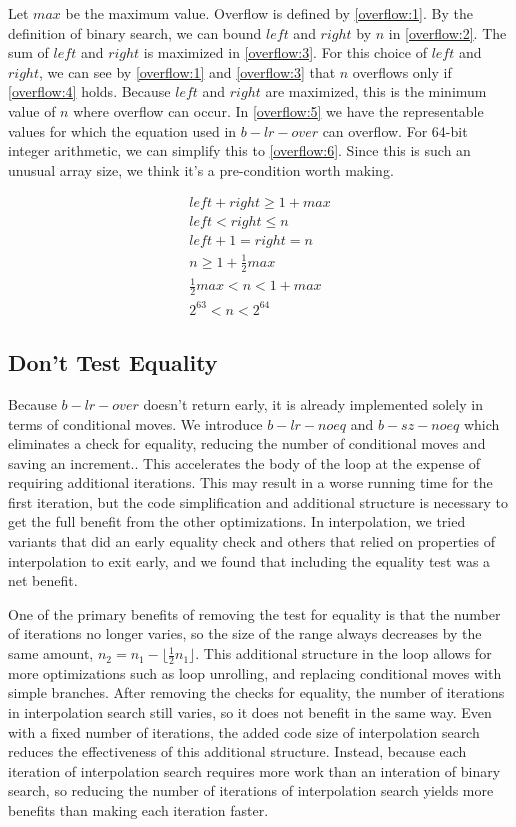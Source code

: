 \documentclass[twocolumn]{article}
\begin{document}
Let $max$ be the maximum value. Overflow is defined by \eqref{overflow:1}. By the definition of binary search, we can bound $left$ and $right$ by $n$ in \eqref{overflow:2}. The sum of $left$ and $right$ is maximized in \eqref{overflow:3}. For this choice of $left$ and $right$, we can see by \eqref{overflow:1} and \eqref{overflow:3} that $n$ overflows only if \eqref{overflow:4} holds. Because $left$ and $right$ are maximized, this is the minimum value of $n$ where overflow can occur. In \eqref{overflow:5} we have the representable values for which the equation used in $b-lr-over$ can overflow. For 64-bit integer arithmetic, we can simplify this to \eqref{overflow:6}. Since this is such an unusual array size, we think it's a pre-condition worth making.

\begin{align}
left + right \geq 1 + max \label{overflow:1}
\\ left < right \leq n \label{overflow:2}
\\ left + 1 = right = n \label{overflow:3}
\\ n \geq 1 + \frac{1}{2}max \label{overflow:4}
\\ \frac{1}{2}max < n < 1 + max \label{overflow:5}
\\ 2^{63} < n < 2^{64} \label{overflow:6}
\end{align}

\subsection{Don't Test Equality}
Because $b-lr-over$ doesn't return early, it is already implemented solely in terms of conditional moves. We introduce $b-lr-noeq$ and $b-sz-noeq$ which eliminates a check for equality, reducing the number of conditional moves and saving an increment.. This accelerates the body of the loop at the expense of requiring additional iterations. This may result in a worse running time for the first iteration, but the code simplification and additional structure is necessary to get the full benefit from the other optimizations. In interpolation, we tried variants that did an early equality check and others that relied on properties of interpolation to exit early, and we found that including the equality test was a net benefit.

One of the primary benefits of removing the test for equality is that the number of iterations no longer varies, so the size of the range always decreases by the same amount, $n_2 = n_1 - \lfloor \frac{1}{2}n_1 \rfloor$. This additional structure in the loop allows for more optimizations such as loop unrolling, and replacing conditional moves with simple branches. After removing the checks for equality, the number of iterations in interpolation search still varies, so it does not benefit in the same way. Even with a fixed number of iterations, the added code size of interpolation search reduces the effectiveness of this additional structure. Instead, because each iteration of interpolation search requires more work than an interation of binary search, so reducing the number of iterations of interpolation search yields more benefits than making each iteration faster.
\end{document}
